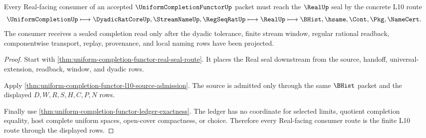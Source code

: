 \begin{theorem}
\label{thm:uniform-completion-functor-real-seal-consumer}
Every Real-facing consumer of an accepted $\UniformCompletionFunctorUp$ packet must reach the $\RealUp$ seal by the concrete L10 route
$$
\UniformCompletionUp \longmapsto \DyadicRatCoreUp,\StreamNameUp,\RegSeqRatUp \longmapsto \RealUp \longmapsto \BHist,\hsame,\Cont,\Pkg,\NameCert .
$$
The consumer receives a sealed completion read only after the dyadic tolerance, finite stream window, regular rational readback, componentwise transport, replay, provenance, and local naming rows have been projected.
\end{theorem}
\begin{proof}
Start with \autoref{thm:uniform-completion-functor-real-seal-route}. It places the Real seal downstream from the source, handoff, universal-extension, readback, window, and dyadic rows.

Apply \autoref{thm:uniform-completion-functor-l10-source-admission}. The source is admitted only through the same $\BHist$ packet and the displayed $D,W,R,S,H,C,P,N$ rows.

Finally use \autoref{thm:uniform-completion-functor-ledger-exactness}. The ledger has no coordinate for selected limits, quotient completion equality, host complete uniform spaces, open-cover compactness, or choice. Therefore every Real-facing consumer route is the finite L10 route through the displayed rows.
\end{proof}

